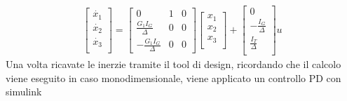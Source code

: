 \documentclass{article}
\begin{document}
\begin{align*}
\begin{bmatrix}
\dot{x_1}\\
\dot{x_2}\\
\dot{x_3}\\
\end{bmatrix}
=
\begin{bmatrix}
0&1&0\\
\frac{G_1 I_G}{\Delta}&0&0\\
-\frac{G_1 I_G}{\Delta}&0&0
\end{bmatrix}
\begin{bmatrix}
x_1\\
x_2\\
x_3\\
\end{bmatrix}
+
\begin{bmatrix}
0\\
-\frac{I_G}{\Delta}\\
\frac{I_T}{\Delta}\\
\end{bmatrix}
u
\end{align*}
Una volta ricavate le inerzie tramite il tool di design, ricordando che il calcolo viene eseguito in caso monodimensionale, viene applicato un controllo PD con simulink
\end{document}
